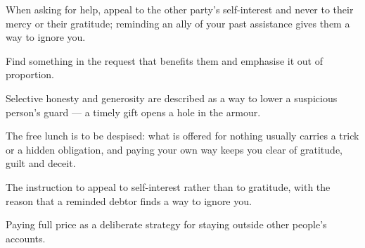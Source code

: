 

\begin{distilled}
  \item When asking for help, appeal to the other party's self-interest and never to their mercy or their gratitude; reminding an ally of your past assistance gives them a way to ignore you.
  \item Find something in the request that benefits them and emphasise it out of proportion.
  \item Selective honesty and generosity are described as a way to lower a suspicious person's guard --- a timely gift opens a hole in the armour.
  \item The free lunch is to be despised: what is offered for nothing usually carries a trick or a hidden obligation, and paying your own way keeps you clear of gratitude, guilt and deceit.
\end{distilled}

\begin{unique}
  \item The instruction to appeal to self-interest rather than to gratitude, with the reason that a reminded debtor finds a way to ignore you.
  \item Paying full price as a deliberate strategy for staying outside other people's accounts.
\end{unique}
